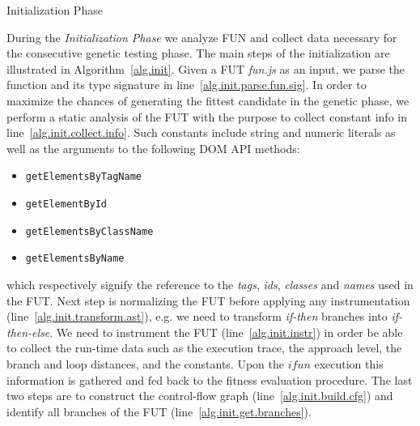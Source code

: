 \documentclass[sigconf]{acmart}
\begin{document}
\begin{algorithm}[t!]
  \caption{Initialization Phase}
  \label{alg.init}
  \scriptsize
  \DontPrintSemicolon
  \SetAlgoVlined
\end{algorithm}

During the \emph{Initialization Phase} we analyze FUN and collect data necessary for the consecutive genetic testing phase. The main steps of the initialization are illustrated in Algorithm~\ref{alg.init}. Given a FUT \emph{fun.js} as an input, we parse the function and its type signature in line~\ref{alg.init.parse.fun.sig}. In order to maximize the chances of generating the fittest candidate in the genetic phase, we perform a static analysis of the FUT with the purpose to collect constant info in line~\ref{alg.init.collect.info}. Such constants include string and numeric literals as well as the arguments to the following DOM API methods:
\begin{itemize}
\item \texttt{getElementsByTagName}
\item \texttt{getElementById}
\item \texttt{getElementsByClassName}
\item \texttt{getElementsByName}
\end{itemize}
which respectively signify the reference to the \emph{tags}, \emph{ids}, \emph{classes} and \emph{names} used in the FUT. Next step is normalizing the FUT before applying any instrumentation (line~\ref{alg.init.transform.ast}), e.g. we need to transform \emph{if-then} branches into \emph{if-then-else}. We need to instrument the FUT (line~\ref{alg.init.instr}) in order be able to collect the run-time data such as the execution trace, the approach level, the branch and loop distances, and the constants. Upon the $ifun$ execution this information is gathered and fed back to the fitness evaluation procedure. The last two steps are to construct the control-flow graph (line~\ref{alg.init.build.cfg}) and identify all branches of the FUT (line~\ref{alg.init.get.branches}).
\end{document}
